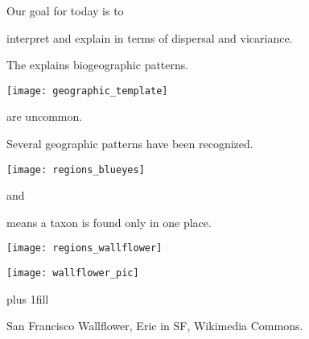 \documentclass[t]{beamer}
\begin{document}

\begin{frame}[t,plain]{Our goal for today is to }

	\hangpara interpret and explain in terms of dispersal and vicariance.
	
\end{frame}

\begin{frame}[t,plain]{The  explains biogeographic patterns.}
	\begin{center}
		\texttt{[image: geographic\_template]}
	\end{center}
\end{frame}



{
\begin{frame}[b,plain]{ are uncommon.}

\end{frame}
}




\begin{frame}[t,plain]{Several geographic patterns have been recognized.}
\begin{multicols}{2}

	\noindent\texttt{[image: regions\_blueyes]}

	\columnbreak
	
	\hangpara{}
	
	\hangpara{}
	
	\hangpara{} and

	\hangpara{}

\end{multicols}
\end{frame}

\begin{frame}[t,plain]{ means a taxon is found only in one place.}
\begin{multicols}{2}

	\texttt{[image: regions\_wallflower]}

	\columnbreak
	
	\hfil\texttt{[image: wallflower\_pic]}\hfill

	\vfill
		
\end{multicols}

	\vskip0pt plus 1fill
	
	\tiny\hfill San Francisco Wallflower, Eric in SF, Wikimedia Commons.

\end{frame}
\end{document}
